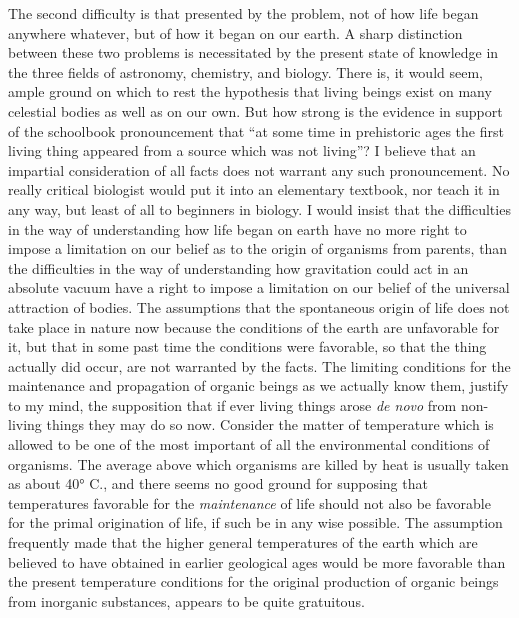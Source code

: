 \documentclass[a4paper, 11pt, oneside, polutonikogreek, english]{article}
\begin{document}
The second difficulty is that presented by the problem, not of how life began anywhere whatever, but of how it began on our earth. A sharp distinction between these two problems is necessitated by the present state of knowledge in the three fields of astronomy, chemistry, and biology. There is, it would seem, ample ground on which to rest the hypothesis that living beings exist on many celestial bodies as well as on our own. But how strong is the evidence in support of the schoolbook pronouncement that ``at some time in prehistoric ages the first living thing appeared from a source which was not living''? I believe that an impartial consideration of all facts does not warrant any such pronouncement. No really critical biologist would put it into an elementary textbook, nor teach it in any way, but least of all to beginners in biology. I would insist that the difficulties in the way of understanding how life began on earth have no more right to impose a limitation on our belief as to the origin of organisms from parents, than the difficulties in the way of understanding how gravitation could act in an absolute vacuum have a right to impose a limitation on our belief of the universal attraction of bodies. The assumptions that the spontaneous origin of life does not take place in nature now because the conditions of the earth are unfavorable for it, but that in some past time the conditions were favorable, so that the thing actually did occur, are not warranted by the facts. The limiting conditions for the maintenance and propagation of organic beings as we actually know them, justify to my mind, the supposition that if ever living things arose \emph{de novo} from non-living things they may do so now. Consider the matter of temperature which is allowed to be one of the most important of all the environmental conditions of organisms. The average above which organisms are killed by heat is usually taken as about 40° C., and there seems no good ground for supposing that temperatures favorable for the \emph{maintenance} of life should not also be favorable for the primal origination of life, if such be in any wise possible. The assumption frequently made that the higher general temperatures of the earth which are believed to have obtained in earlier geological ages would be more favorable than the present temperature conditions for the original production of organic beings from inorganic substances, appears to be quite gratuitous.
\end{document}
